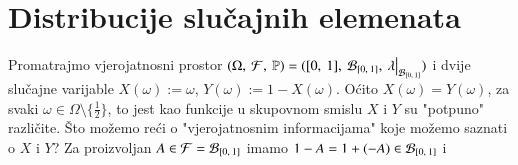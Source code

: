 
\chapter{Distribucije slu\v cajnih elemenata}

\begin{pr}  \label{pr:5.1}
    Promatrajmo vjerojatnosni prostor $\vjerojatnosniProstor = (\segment{0}{1}, \: \borel{\segment{0}{1}}, \: \restr{\lambda}{\borel{\segment{0}{1}}})$ i dvije slu\v cajne varijable $X (\omega) := \omega$, $Y (\omega) := 1 - X (\omega)$.
    O\' cito $X(\omega) = Y(\omega)$, za svaki $\omega \in \Omega \setminus \{ \frac{1}{2} \}$, to jest kao funkcije u skupovnom smislu $X$ i $Y$ su "potpuno" razli\v cite.
    \v Sto mo\v zemo re\' ci o "vjerojatnosnim informacijama" koje mo\v zemo saznati o $X$ i $Y$?
    Za proizvoljan $A \in \mathcal{F} = \mathcal{B}_{[{0}, \:{1}]}$ imamo $1-A = 1 + (-A) \in \mathcal{B}_{[{0}, \:{1}]}$ i 
\end{pr}